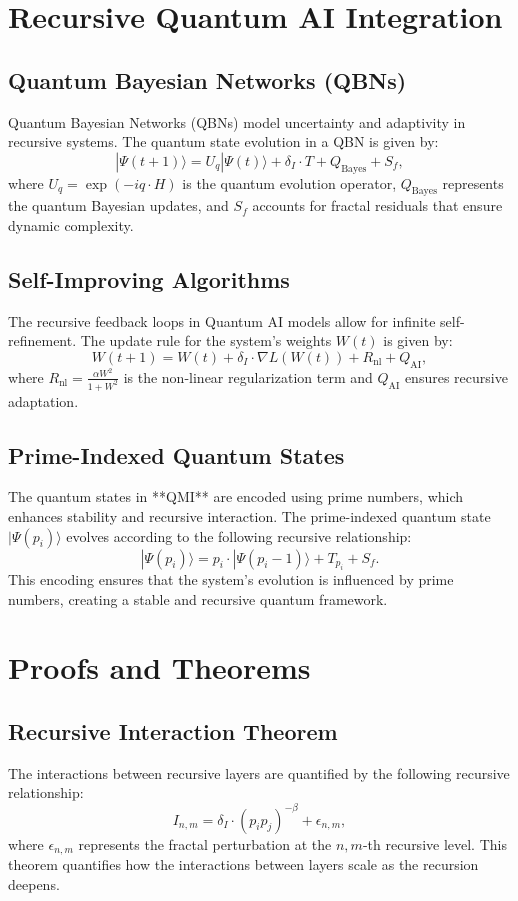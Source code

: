 \documentclass{article}
\theoremstyle{plain}
\begin{document}
\section{Recursive Quantum AI Integration}

\subsection{Quantum Bayesian Networks (QBNs)}
Quantum Bayesian Networks (QBNs) model uncertainty and adaptivity in recursive systems. The quantum state evolution in a QBN is given by:
\[
|\Psi(t+1)\rangle = U_q |\Psi(t)\rangle + \delta_I \cdot T + Q_\text{Bayes} + S_f,
\]
where \( U_q = \exp(-i q \cdot H) \) is the quantum evolution operator, \( Q_\text{Bayes} \) represents the quantum Bayesian updates, and \( S_f \) accounts for fractal residuals that ensure dynamic complexity.

\subsection{Self-Improving Algorithms}
The recursive feedback loops in Quantum AI models allow for infinite self-refinement. The update rule for the system's weights \( W(t) \) is given by:
\[
W(t+1) = W(t) + \delta_I \cdot \nabla L(W(t)) + R_\text{nl} + Q_\text{AI},
\]
where \( R_\text{nl} = \frac{\alpha W^2}{1 + W^2} \) is the non-linear regularization term and \( Q_\text{AI} \) ensures recursive adaptation.

\subsection{Prime-Indexed Quantum States}
The quantum states in **QMI** are encoded using prime numbers, which enhances stability and recursive interaction. The prime-indexed quantum state \( |\Psi(p_i)\rangle \) evolves according to the following recursive relationship:
\[
|\Psi(p_i)\rangle = p_i \cdot |\Psi(p_i-1)\rangle + T_{p_i} + S_f.
\]
This encoding ensures that the system's evolution is influenced by prime numbers, creating a stable and recursive quantum framework.

\section{Proofs and Theorems}

\subsection{Recursive Interaction Theorem}
The interactions between recursive layers are quantified by the following recursive relationship:
\[
I_{n,m} = \delta_I \cdot (p_i p_j)^{-\beta} + \epsilon_{n,m},
\]
where \( \epsilon_{n,m} \) represents the fractal perturbation at the \( n, m \)-th recursive level. This theorem quantifies how the interactions between layers scale as the recursion deepens.
\end{document}
